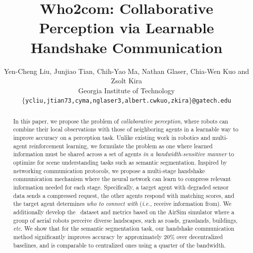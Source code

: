 \documentclass[letterpaper, 10 pt, conference]{ieeeconf}  %
\title{\LARGE \bf Who2com: Collaborative Perception via Learnable Handshake Communication }
\author{
  Yen-Cheng Liu, Junjiao Tian, Chih-Yao Ma, Nathan Glaser, Chia-Wen Kuo and Zsolt Kira\\
Georgia Institute of Technology\\
\texttt{$\{$ycliu,jtian73,cyma,nglaser3,albert.cwkuo,zkira$\}$@gatech.edu}
}
\begin{document}
\maketitle


\begin{abstract}

In this paper, we propose the problem of \textit{collaborative perception}, where robots can combine their local observations with those of neighboring agents in a learnable way to improve accuracy on a perception task. Unlike existing work in robotics and multi-agent reinforcement learning, we formulate the problem as one where learned information must be shared across a set of agents \textit{in a bandwidth-sensitive manner} to optimize for scene understanding tasks such as semantic segmentation. Inspired by networking communication protocols, we propose a multi-stage handshake communication mechanism where the neural network can learn to compress relevant information needed for each stage. Specifically, a target agent with degraded sensor data sends a compressed request, the other agents respond with matching scores, and the target agent determines \textit{who to connect with} (\textit{i.e.,} receive information from). We additionally develop the \DatasetName~dataset and metrics based on the AirSim simulator where a group of aerial robots perceive diverse landscapes, such as roads, grasslands, buildings, \textit{etc}. We show that for the semantic segmentation task, our handshake communication method significantly improves accuracy by approximately 20\% over decentralized baselines, and is comparable to centralized ones using a quarter of the bandwidth. 
\end{abstract}












\vspace{-1mm}
\end{document}

